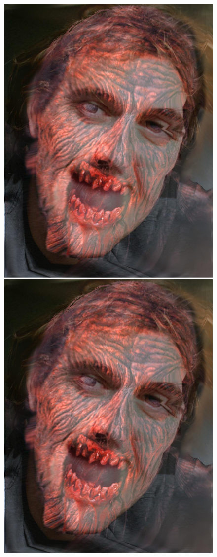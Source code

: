 \documentclass[11pt]{article}
\begin{document}
\begin{figure}[H]
\begin{center}
\includegraphics[scale=0.08]{figs/zombie/zombie_bf_13.jpg} 
\includegraphics[scale=0.08]{figs/zombie/zombie_bf_14.jpg} 

\end{center}
\end{figure}
\end{document}

